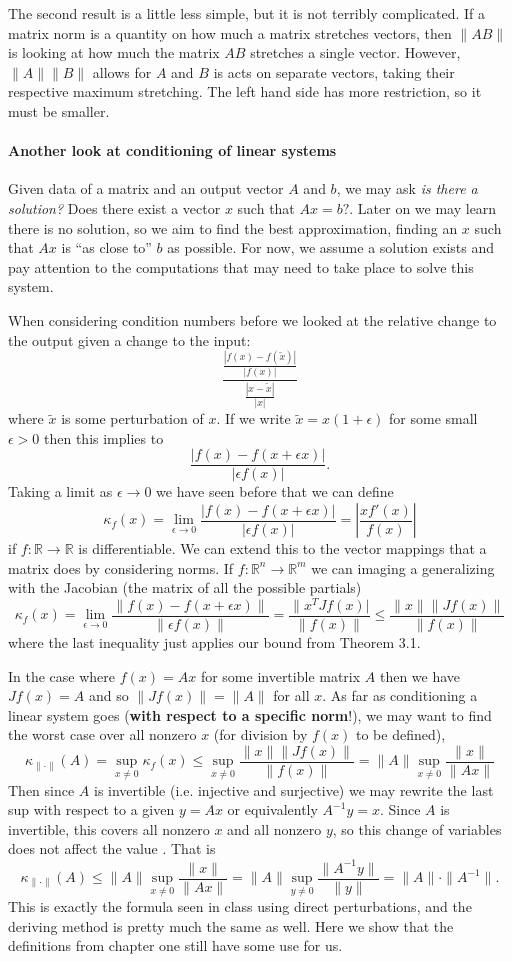\documentclass[11pt]{article}
\newcommand{\R}{\mathbb{R}}
\begin{document}
The second result is a little less simple, but it is not terribly complicated. If a matrix norm is a quantity on how much a matrix stretches vectors, then $\|AB\|$ is looking at how much the matrix $AB$ stretches a single vector. However, $\|A\|\|B\|$ allows for $A$ and $B$ is acts on separate vectors, taking their respective maximum stretching. The left hand side has more restriction, so it must be smaller. 

\paragraph{Another look at conditioning of linear systems} Given data of a matrix and an output vector $A$ and $b$, we may ask \textit{is there a solution?} Does there exist a vector $x$ such that $Ax=b?$. Later on we may learn there is no solution, so we aim to find the best approximation, finding an $x$ such that $Ax$ is ``as close to'' $b$ as possible. For now, we assume a solution exists and pay attention to the computations that may need to take place to solve this system.

When considering condition numbers before we looked at the relative change to the output given a change to the input: $$\frac{\frac{|f(x)-f(\tilde{x})|}{|f(x)|}}{\frac{|x-\tilde{x}|}{|x|}}$$
where $\tilde{x}$ is some perturbation of $x$. If we write $\tilde{x} = x(1+\epsilon)$ for some small $\epsilon > 0$ then this implies to $$\frac{|f(x)-f(x+\epsilon x)|}{|\epsilon f(x)|}.$$
Taking a limit as $\epsilon \to 0$ we have seen before that we can define $$\kappa_f(x) = \lim_{\epsilon \to 0}\frac{|f(x)-f(x+\epsilon x)|}{|\epsilon f(x)|} = \left|\frac{x f'(x)}{f(x)}\right|$$
if $f : \R \to \R$ is  differentiable. We can extend this to the vector mappings that a matrix does by considering norms. If $f : \R^n \to \R^m$ we can imaging a generalizing with the Jacobian (the matrix of all the possible partials)  $$\kappa_f(x) = \lim_{\epsilon \to 0}\frac{\|f(x)-f(x+\epsilon x)\|}{\|\epsilon f(x)\|} = \frac{\|x^T J f(x)|}{\|f(x)\|} \leq \frac{\|x\|\|J f(x)\|}{\|f(x)\|}$$
where the last inequality just applies our bound from Theorem 3.1. 

In the case where $f(x) = Ax$ for some invertible matrix $A$ then we have $J f(x)=A$ and so $\|Jf(x)\| = \|A\|$ for all $x$. As far as conditioning a linear system goes (\textbf{with respect to a specific norm}!), we may want to find the worst case over all nonzero $x$ (for division by $f(x)$ to be defined), $$\kappa_{\|\cdot\|}(A) = \sup_{x \ne 0} \kappa_{f}(x) \leq \sup_{x \ne 0} \frac{\|x\|\|Jf(x)\|}{\|f(x)\|} = \|A\|\sup_{x \ne 0} \frac{\|x\|}{\|Ax\|}$$
Then since $A$ is invertible (i.e. injective and surjective) we may rewrite the last sup with respect to a given $y = Ax$ or equivalently $A^{-1}y = x$. Since $A$ is invertible, this covers all nonzero $x$ and all nonzero $y$, so this change of variables does not affect the value . That is $$\kappa_{\|\cdot\|}(A) \leq \|A\| \sup_{x \ne 0} \frac{\|x\|}{\|Ax\|} = \|A\|\sup_{y \ne 0}\frac{\|A^{-1}y\|}{\|y\|} = \|A\|\cdot\|A^{-1}\|.$$
This is exactly the formula seen in class using direct perturbations, and the deriving method is pretty much the same as well. Here we show that the definitions from chapter one still have some use for us. 
\end{document}

